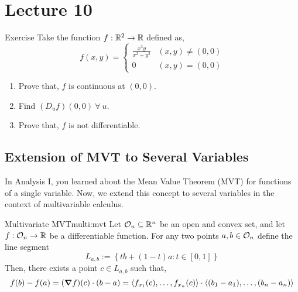 \documentclass[../Analysis-3.tex]{subfiles}
\begin{document}
\chapter*{Lecture 10} %
\setcounter{chapter}{10} %


\begin{Eg}{Exercise}{}
  Take the function $ f:\mathbb{R}^2 \to \mathbb{R} $ defined as, \[  f(x,y) = \begin{cases}
      \frac{x^{3}y}{x^2 + y^2} & (x,y) \neq (0,0) \\
      0                        & (x,y) = (0,0)
    \end{cases}  \]
  \begin{enumerate}[label=(\roman*)]
    \item Prove that, $f$ is continuous at $(0,0)$.
    \item Find $(D_{u}f)(0,0)\ \forall\ u$.
    \item Prove that, $f$ is not differentiable.
  \end{enumerate}
\end{Eg}

\section{Extension of MVT to Several Variables}

In Analysis I, you learned about the Mean Value Theorem (MVT) for functions of a single variable. Now, we extend this concept to several variables in the context of multivariable calculus.

\begin{Thm}{Multivariate MVT}{multi:mvt}
  Let $ \mathcal{O}_{n} \subseteq \mathbb{R}^n $ be an open and convex set, and let $ f : \mathcal{O}_{n} \to \mathbb{R}$ be a differentiable function. For any two points $ a,b \in \mathcal{O}_{n} $ define the  line segment \[  L_{a,b} := \left\{ tb + (1-t)a : t \in [0,1]\right\}  \]
  Then, there exists a point $ c \in L_{a,b}$ such that,
  \[
    f(b) - f(a) = (\grad f)(c)\cdot (b-a) = \left\langle f_{x_1}(c), \ldots, f_{x_n}(c) \right\rangle \cdot \left\langle (b_1 - a_1), \ldots, (b_n - a_n) \right\rangle
  \]
\end{Thm}
\end{document}
